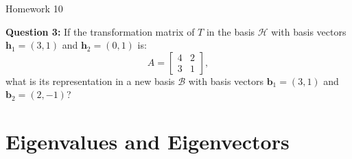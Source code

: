 \documentclass[10pt, aspectratio=169]{beamer}
\begin{document}
\begin{frame}{Homework 10}
\vspace{.25cm}

\textbf{Question 3:}
If the transformation matrix of \( T \) in the basis \( {\mathcal{H}} \) with basis vectors \( \mathbf{h}_1 = (3,1) \) and \( \mathbf{h}_2 = (0,1) \) is:
   \[
   A = \begin{bmatrix} 4 & 2 \\ 3 & 1 \end{bmatrix},
   \]
   what is its representation in a new basis \( {\mathcal{B}} \) with basis vectors \( \mathbf{b}_1 = (3,1) \) and \( \mathbf{b}_2 = (2,-1) \)?
\end{frame}


\section{Eigenvalues and Eigenvectors}
\end{document}
